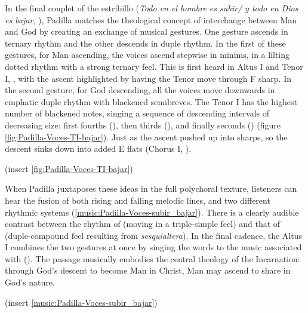 In the final couplet of the estribillo (\emph{Todo en el hombre es subir/ y todo en
Dios es bajar}, ), Padilla matches the theological concept of
interchange between Man and God by creating an exchange of musical
gestures.
One gesture ascends in ternary rhythm and the other descends in duple rhythm.
In the first of these gestures, for Man ascending, the voices ascend stepwise in
minims, in a lilting dotted rhythm with a strong ternary feel.
This is first heard in Altus I and Tenor I, , with the ascent
highlighted by having the Tenor move through F sharp.
In the second gesture, for God descending, all the voices move downwards in
emphatic duple rhythm with blackened semibreves.
The Tenor I has the highest number of blackened notes, singing a sequence of
descending intervals of decreasing size: first fourths (), then
thirds (), and finally seconds () (figure
\ref{fig:Padilla-Voces-TI-bajar}).
Just as the ascent pushed up into sharps, so the descent sinks down into added
E flats (Chorus I, ).


(insert \cref{fig:Padilla-Voces-TI-bajar})
\label{fig:Padilla-Voces-TI-bajar}

When Padilla juxtaposes these ideas in the full polychoral texture, listeners
can hear the fusion of both rising and falling melodic lines, and two different
rhythmic systems (\cref{music:Padilla-Voces-subir_bajar}).
There is a clearly audible contrast between the rhythm of 
(moving in a triple-simple feel) and that of  (duple-compound
feel resulting from \emph{sesquialtera}).
In the final cadence, the Altus I combines the two gestures at once by singing the words  to the music associated with  ().
The passage musically embodies the central theology of the Incarnation: through
God's descent to become Man in Christ, Man may ascend to share in God's nature.

(insert \cref{music:Padilla-Voces-subir_bajar})
\label{music:Padilla-Voces-subir_bajar}

